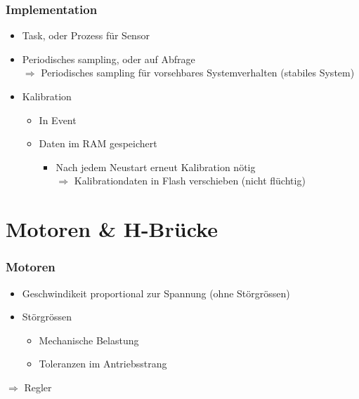 \documentclass{beamer}
\begin{document}
\begin{frame}
	\frametitle{Implementation}
	\begin{itemize}
		\item{Task, oder Prozess für Sensor}
		\item{Periodisches sampling, oder auf Abfrage\\
		$\Rightarrow$ Periodisches sampling für vorsehbares Systemverhalten (stabiles System)}
		\item{Kalibration}
		\begin{itemize}
			\item{In Event}
			\item{Daten im RAM gespeichert}
			\begin{itemize}
				\item{Nach jedem Neustart erneut Kalibration nötig \\
				$\Rightarrow$ Kalibrationdaten in Flash verschieben (nicht flüchtig)}
			\end{itemize}
		\end{itemize}

	\end{itemize}
\end{frame}


\section{Motoren \& H-Brücke} %
\begin{frame}
	\frametitle{Motoren}
	\begin{itemize}
		\item{Geschwindikeit proportional zur Spannung (ohne Störgrössen)}
		\item{Störgrössen}
		\begin{itemize}
			\item{Mechanische Belastung}
			\item{Toleranzen im Antriebsstrang}
		\end{itemize}
	\end{itemize}

	\begin{exampleblock}{}
		\centering
		$\Rightarrow$ Regler
	\end{exampleblock}
	
\end{frame}
\end{document}

